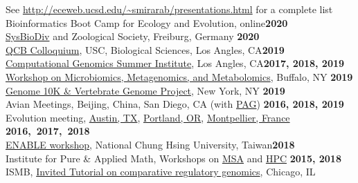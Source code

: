 \documentclass[margin,line,letterpaper]{resume}
\begin{document}
\begin{resume}
        See \url{http://eceweb.ucsd.edu/~smirarab/presentations.html} for a complete list\vspace{2mm}\\
   Bioinformatics Boot Camp for Ecology and Evolution, online\hfill \textbf{2020} \\
\href{https://twitter.com/sysbiodiv}{SysBioDiv} and Zoological Society, Freiburg, Germany \hfill \textbf{2020} \\
      \href{https://uscbiscgrad.blogspot.com/2019/10/dr.html}{QCB Colloquium}, USC, Biological Sciences, Los Angles, CA\hfill \textbf{2019}\\
        \href{http://computationalgenomics.bioinformatics.ucla.edu/schedule/}{Computational Genomics Summer Institute}, Los Angles, CA\hfill \textbf{2017, 2018, 2019}\\
        \href{https://sites.google.com/view/mmm2019/home}{Workshop on Microbiomics, Metagenomics, and Metabolomics}, Buffalo, NY  \hfill \textbf{2019}\\
         \href{https://www.eventbrite.com/e/the-g10k-vgpebp-meeting-tickets-59112745814?aff=ebdshpsearchautocomplete}{Genome 10K \& Vertebrate Genome Project}, New York, NY \hfill \textbf{2019}\\
        Avian Meetings, Beijing, China,  San Diego, CA (with \href{https://pag.confex.com/pag/xxvii/meetingapp.cgi/Paper/36191}{PAG}) \hfill \textbf{2016, 2018, 2019}\\
        Evolution meeting,  \href{https://www.evolutionmeetings.org/uploads/4/8/8/0/48804503/evolution_2016_final_pdf_program.pdf}{Austin, TX},  \href{http://www.evolutionmeetings.org/uploads/4/8/8/0/48804503/final_evol2017_program.pdf}{Portland, OR}, \href{http://tandy.cs.illinois.edu/PhyloSynth-Symp2018.html}{Montpellier, France} \hfill \textbf{2016,~2017,~2018}\\
 \href{http://enable.nchu.edu.tw/international-page.php?uuid=f46f7f64-399e-11e9-97aa-309c231618d5}{ENABLE workshop},         National Chung Hsing University, Taiwan\hfill \textbf{2018}\\
        Institute for Pure \& Applied Math, Workshops on \href{http://www.ipam.ucla.edu/programs/workshops/multiple-sequence-alignment/?tab=speaker-list}{MSA} and \href{http://www.ipam.ucla.edu/programs/workshops/workshop-iii-hpc-for-computationally-and-data-intensive-problems/?tab=speaker-list}{HPC} \hfill \textbf{2015, 2018}\\
        ISMB, \href{https://www.iscb.org/ismb2018-program/ismb2018-tutorials#am4}{Invited Tutorial on comparative regulatory genomics}, Chicago, IL 

\end{resume}
\end{document}

